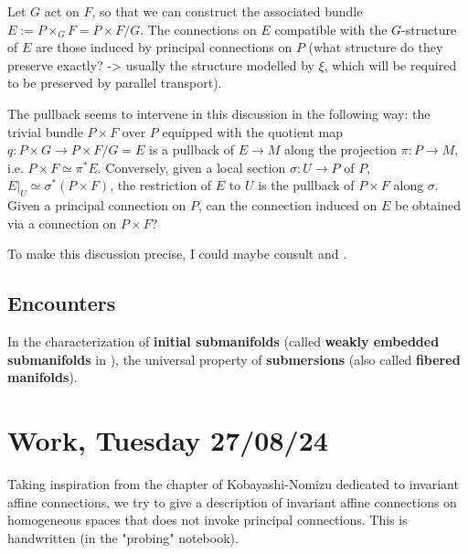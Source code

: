 \documentclass[a4paper,12pt,parskip=half*,chapterprefix=true,numbers=noendperiod]{scrreprt}
\theoremstyle{definition}
\theoremstyle{remark}
\begin{document}
Let $G$ act on $F$, so that we can construct the associated bundle $E:=P\times_GF=P\times F/G$. The connections on $E$ compatible with the $G$-structure of $E$ are those induced by principal connections on $P$ (what structure do they preserve exactly? -> usually the structure modelled by $\xi$, which will be required to be preserved by parallel transport).

The pullback seems to intervene in this discussion in the following way: the trivial bundle $P\times F$ over $P$ equipped with the quotient map $q:P\times G\to P\times F/G=E$ is a pullback of $E\to M$ along the projection $\pi:P\to M$, i.e. $P\times F\simeq \pi^*E$. Conversely, given a local section $\sigma :U\to P$ of $P$, $E|_U\simeq \sigma^*(P\times F)$, the restriction of $E$ to $U$ is the pullback of $P\times F$ along $\sigma$. Given a principal connection on $P$, can the connection induced on $E$ be obtained via a connection on $P\times F$?

To make this discussion precise, I could maybe consult \cite{KMS:NatDiffGeo} and \cite{vakar:BundlesGauges}.

\subsection{Encounters}

In \cite{KMS:NatDiffGeo} the characterization of \textbf{initial submanifolds} (called \textbf{weakly embedded submanifolds} in \cite{Lee:IntSmMan}), the universal property of \textbf{submersions} (also called \textbf{fibered manifolds}).

\section{Work, Tuesday 27/08/24}\label{tue27/08/24}

Taking inspiration from the chapter of Kobayashi-Nomizu \cite{KN:FundDiffGeo} dedicated to invariant affine connections, we try to give a description of invariant affine connections on homogeneous spaces that does not invoke principal connections. This is handwritten \cite{personalHand:Connections} (in the "probing" notebook).
\end{document}
